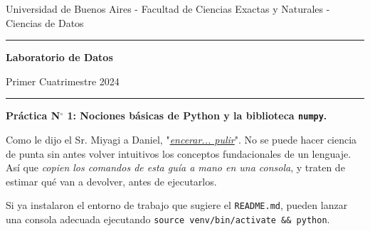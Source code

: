 \documentclass[a4paper,11pt]{article}
\theoremstyle{definition}
\begin{document}
\centerline{{\small Universidad de Buenos Aires - Facultad de Ciencias Exactas y Naturales - Ciencias de Datos}}

\vskip 0.2cm

\hrule

\vskip 0.2cm

 \centerline{{\bf\Large{\sc Laboratorio de Datos}}}

 \vskip 0.2cm

 \centerline{\ttfamily Primer Cuatrimestre 2024}

\vskip 0.2cm

 \hrule

 \bigskip
 \centerline{\bf Práctica N$^\circ$ 1: Nociones básicas de Python y la biblioteca \lstinline{numpy}.}
 \bigskip

Como le dijo el Sr. Miyagi a Daniel, "\emph{\href{https://www.youtube.com/watch?v=tM-wKYKw0tI}{encerar... pulir}}". No se puede hacer ciencia de punta sin antes volver intuitivos los conceptos fundacionales de un lenguaje. Así que \emph{copien los comandos de esta guía a mano en una consola}, y traten de estimar qué van a devolver, antes de ejecutarlos.

Si ya instalaron el entorno de trabajo que sugiere el \lstinline|README.md|, pueden lanzar una consola adecuada ejecutando \lstinline|source venv/bin/activate && python|.
\end{document}
